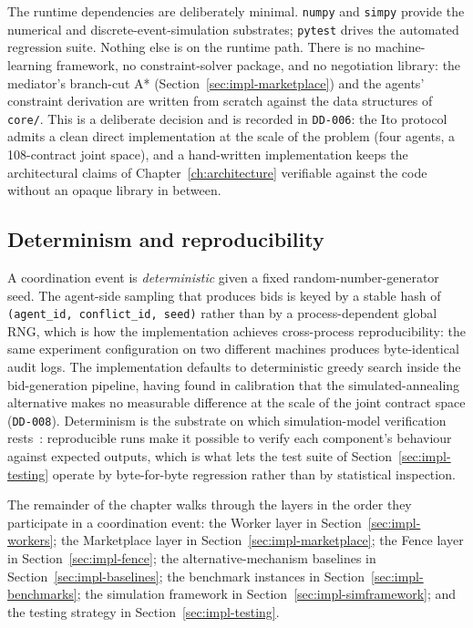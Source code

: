 The runtime dependencies are deliberately minimal. \texttt{numpy} and
\texttt{simpy} provide the numerical and discrete-event-simulation
substrates; \texttt{pytest} drives the automated regression suite.
Nothing else is on the runtime path. There is no machine-learning
framework, no constraint-solver package, and no negotiation library:
the mediator's branch-cut A* (Section~\ref{sec:impl-marketplace}) and
the agents' constraint derivation are written from scratch against the
data structures of \texttt{core/}. This is a deliberate decision and is
recorded in \texttt{DD-006}: the Ito \cite{ito2007multiissue} protocol
admits a clean direct implementation at the scale of the problem (four
agents, a 108-contract joint space), and a hand-written implementation
keeps the architectural claims of Chapter~\ref{ch:architecture}
verifiable against the code without an opaque library in between.

\subsection{Determinism and reproducibility}

A \NEXUS{} coordination event is \emph{deterministic} given a fixed
random-number-generator seed. The agent-side sampling that produces
bids is keyed by a stable hash of \texttt{(agent\_id, conflict\_id,
seed)} rather than by a process-dependent global RNG, which is how the
implementation achieves cross-process reproducibility: the same
experiment configuration on two different machines produces byte-identical
audit logs. The implementation defaults to deterministic greedy search
inside the bid-generation pipeline, having found in calibration that the
simulated-annealing alternative makes no measurable difference at the
scale of the joint contract space (\texttt{DD-008}). Determinism is the
substrate on which simulation-model verification
rests~\cite{sargent2013verification}: reproducible runs make it
possible to verify each component's behaviour against expected
outputs, which is what lets the test suite of
Section~\ref{sec:impl-testing} operate by byte-for-byte regression
rather than by statistical inspection.

The remainder of the chapter walks through the layers in the order they
participate in a coordination event: the Worker layer in
Section~\ref{sec:impl-workers}; the Marketplace layer in
Section~\ref{sec:impl-marketplace}; the Fence layer in
Section~\ref{sec:impl-fence}; the alternative-mechanism baselines in
Section~\ref{sec:impl-baselines}; the benchmark instances in
Section~\ref{sec:impl-benchmarks}; the simulation framework in
Section~\ref{sec:impl-simframework}; and the testing strategy in
Section~\ref{sec:impl-testing}.

